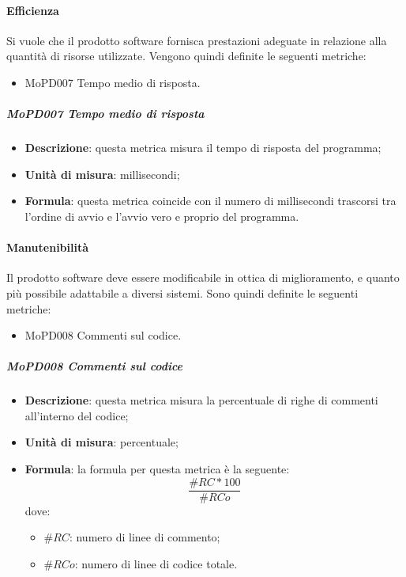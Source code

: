 \documentclass[../norme-di-progetto.tex]{subfiles}
\begin{document}
\paragraph{Efficienza}
Si vuole che il prodotto software fornisca prestazioni adeguate in relazione alla quantità di risorse utilizzate. Vengono quindi definite le seguenti metriche:
\begin{itemize}
  \item MoPD007 Tempo medio di risposta.
\end{itemize}
\subparagraph{MoPD007 Tempo medio di risposta}
\begin{itemize}
  \item \textbf{Descrizione}: questa metrica misura il tempo di risposta del programma;
  \item \textbf{Unità di misura}: millisecondi;
  \item \textbf{Formula}: questa metrica coincide con il numero di millisecondi trascorsi tra l'ordine di avvio e l'avvio vero e proprio del programma.
\end{itemize}
\paragraph{Manutenibilità}
Il prodotto software deve essere modificabile in ottica di miglioramento, e quanto più possibile adattabile a diversi sistemi. Sono quindi definite le seguenti metriche:
\begin{itemize}
  \item MoPD008 Commenti sul codice.
\end{itemize}
\subparagraph{MoPD008 Commenti sul codice}
\begin{itemize}
  \item \textbf{Descrizione}: questa metrica misura la percentuale di righe di commenti all'interno del codice;
  \item \textbf{Unità di misura}: percentuale;
  \item \textbf{Formula}: la formula per questa metrica è la seguente:
  \begin{displaymath}
    \frac{\#RC * 100}{\#RCo}
  \end{displaymath}
  dove:
  \begin{itemize}
    \item $ \#RC $: numero di linee di commento;
    \item $ \#RCo $: numero di linee di codice totale.
  \end{itemize}
\end{itemize}


\newpage
\end{document}
